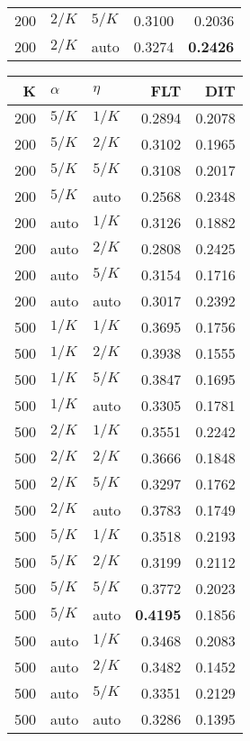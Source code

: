 \begin{table}
\begin{spacing}{1.2}
{\begin{tabular}{rll|rr}
 200 &  $2/K$ &  $5/K$ &           0.3100 &       0.2036 \\
 200 &  $2/K$ &   auto &           0.3274 & {\bf 0.2426} \\
\bottomrule
\end{tabular}
} \hfill \parbox{.45\linewidth}{\centering \begin{tabular}{rll|rr}
\toprule
   K &  $\alpha$ &    $\eta$ & FLT & DIT \\
\midrule
 200 &  $5/K$ &  $1/K$ &           0.2894 & 0.2078 \\
 200 &  $5/K$ &  $2/K$ &           0.3102 & 0.1965 \\
 200 &  $5/K$ &  $5/K$ &           0.3108 & 0.2017 \\
 200 &  $5/K$ &   auto &           0.2568 & 0.2348 \\
 200 &   auto &  $1/K$ &           0.3126 & 0.1882 \\
 200 &   auto &  $2/K$ &           0.2808 & 0.2425 \\
 200 &   auto &  $5/K$ &           0.3154 & 0.1716 \\
 200 &   auto &   auto &           0.3017 & 0.2392 \\
 500 &  $1/K$ &  $1/K$ &           0.3695 & 0.1756 \\
 500 &  $1/K$ &  $2/K$ &           0.3938 & 0.1555 \\
 500 &  $1/K$ &  $5/K$ &           0.3847 & 0.1695 \\
 500 &  $1/K$ &   auto &           0.3305 & 0.1781 \\
 500 &  $2/K$ &  $1/K$ &           0.3551 & 0.2242 \\
 500 &  $2/K$ &  $2/K$ &           0.3666 & 0.1848 \\
 500 &  $2/K$ &  $5/K$ &           0.3297 & 0.1762 \\
 500 &  $2/K$ &   auto &           0.3783 & 0.1749 \\
 500 &  $5/K$ &  $1/K$ &           0.3518 & 0.2193 \\
 500 &  $5/K$ &  $2/K$ &           0.3199 & 0.2112 \\
 500 &  $5/K$ &  $5/K$ &           0.3772 & 0.2023 \\
 500 &  $5/K$ &   auto &     {\bf 0.4195} & 0.1856 \\
 500 &   auto &  $1/K$ &           0.3468 & 0.2083 \\
 500 &   auto &  $2/K$ &           0.3482 & 0.1452 \\
 500 &   auto &  $5/K$ &           0.3351 & 0.2129 \\
 500 &   auto &   auto &           0.3286 & 0.1395 \\
\bottomrule
\end{tabular}
}
\end{spacing}
\end{table}
